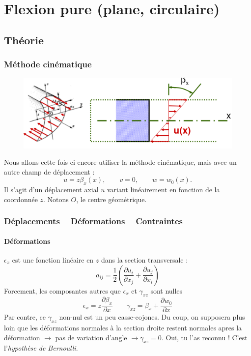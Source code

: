 \chapter{Flexion pure (plane, circulaire)}
\section{Théorie}
	\subsection{Méthode cinématique}
	\begin{figure}
	\vspace{-7mm}
	\includegraphics[scale=0.4]{ch4/image1.png}
	\end{figure}
	Nous allons cette fois-ci encore utiliser la méthode cinématique, mais 
	avec un autre champ de déplacement :
	\begin{equation}
	u=z\beta_x(x),\qquad v=0,\qquad w=w_0(x).
	\end{equation}
	Il s'agit d'un déplacement axial $u$ variant linéairement en fonction 
	de la coordonnée $z$. Notons $O$, le centre géométrique.
	
	\subsection{Déplacements – Déformations – Contraintes}
		\subsubsection{Déformations}
		$\epsilon_x$ est une fonction linéaire en $z$ dans la section 
		transversale :
		\begin{equation}
		a_{ij} =  \frac{1}{2}\left(\dfrac{\partial u_i}{\partial x_j}+\dfrac{
		\partial u_j}{\partial x_i}\right)
		\end{equation}
		Forcement, les composantes autres que $\epsilon_x$ et $\gamma_{xz}$ 
		sont nulles
		\begin{equation}
		\epsilon_x = z\dfrac{\partial \beta_x}{\partial x}\qquad \gamma_{xz} = 
		\beta_x + \dfrac{\partial w_0}{\partial x}
		\end{equation}
		Par contre, ce $\gamma_{xz}$ non-nul est un peu casse-cojones. Du coup, 
		on supposera plus loin que les déformations normales à la section 
		droite restent normales apres la déformation $\rightarrow$ pas de 
		variation d'angle $\rightarrow \gamma_{xz} = 0$. Oui, tu l'as reconnu ! 
		C'est l'\textit{hypothèse de Bernoulli}.
		
